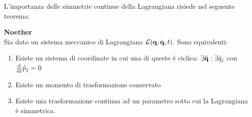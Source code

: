    L'importanza delle simmetrie continue della Lagrangiana risiede nel seguente teorema:
   \begin{theorem}
       \textbf{Noether}\\
       Sia dato un sistema meccanico di Lagrangiana $\mathcal{L}(\mathbf{q},\dot{\mathbf{q}},t)$. Sono equivalenti:
       \begin{enumerate}
           \item Esiste un sistema di coordinate in cui una di queste è ciclica: $\exists \tilde{\mathbf{q}}:\exists \tilde{q}_j$ con $\frac{\mathrm{d}}{\mathrm{d}t} \tilde{p}_j=0$
           \item Esiste un momento di trasformazione conservato
           \item Esiste una trasformazione continua ad un parametro sotto cui la Lagrangiana è simmetrica.
       \end{enumerate}
   \end{theorem}
